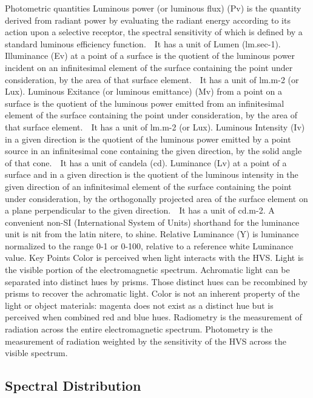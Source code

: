 Photometric quantities
Luminous power (or luminous flux) (Pv) is the quantity derived from radiant power by evaluating the radiant energy according to its action upon a selective receptor, the spectral sensitivity of which is defined by a standard luminous efficiency function.   It has a unit of Lumen (lm.sec-1).
Illuminance (Ev) at a point of a surface is the quotient of the luminous power incident on an infinitesimal element of the surface containing the point under consideration, by the area of that surface element.   It has a unit of lm.m-2 (or Lux).
Luminous Exitance (or luminous emittance) (Mv) from a point on a surface is the quotient of the luminous power emitted from an infinitesimal element of the surface containing the point under consideration, by the area of that surface element.   It has a unit of lm.m-2 (or Lux).
Luminous Intensity (Iv) in a given direction is the quotient of the luminous power emitted by a point source in an infinitesimal cone containing the given direction, by the solid angle of that cone.   It has a unit of candela (cd).
Luminance (Lv) at a point of a surface and in a given direction is the quotient of the luminous intensity in the given direction of an infinitesimal element of the surface containing the point under consideration, by the orthogonally projected area of the surface element on a plane perpendicular to the given direction.   It has a unit of cd.m-2. A convenient non-SI (International System of Units) shorthand for the luminance unit is nit from the latin nitere, to shine.
Relative Luminance (Y) is luminance normalized to the range 0-1 or 0-100, relative to a reference white Luminance value.
Key Points
Color is perceived when light interacts with the HVS.
Light is the visible portion of the electromagnetic spectrum.
Achromatic light can be separated into distinct hues by prisms. Those distinct hues can be recombined by prisms to recover the achromatic light.
Color is not an inherent property of the light or object materials:  magenta does not exist as a distinct hue but is perceived when combined red and blue hues.
Radiometry is the measurement of radiation across the entire electromagnetic spectrum.
Photometry is the measurement of radiation weighted by the sensitivity of the HVS across the visible spectrum.

\subsection{Spectral Distribution}
\label{subsec:spectral-distribution}

